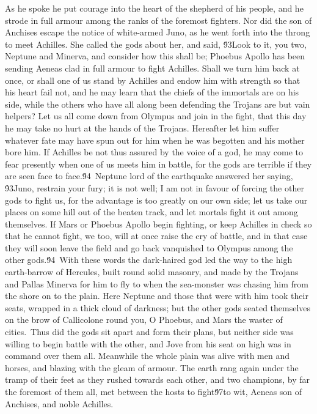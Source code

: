 {As he spoke he put courage into the heart of the shepherd of his people, and he strode in full armour among the ranks of the foremost fighters. Nor did the son of Anchises escape the notice of white-armed Juno, as he went forth into the throng to meet Achilles. She called the gods about her, and said, \'93Look to it, you two, Neptune and Minerva, and consider how this shall be; Phoebus Apollo has been sending Aeneas clad in full armour to fight Achilles. Shall we turn him back at once, or shall one of us stand by Achilles and endow him with strength so that his heart fail not, and he may learn that the chiefs of the immortals are on his side, while the others who have all along been defending the Trojans are but vain helpers? Let us all come down from Olympus and join in the fight, that this day he may take no hurt at the hands of the Trojans. Hereafter let him suffer whatever fate may have spun out for him when he was begotten and his mother bore him. If Achilles be not thus assured by the voice of a god, he may come to fear presently when one of us meets him in battle, for the gods are terrible if they are seen face to face.\'94\
Neptune lord of the earthquake answered her saying, \'93Juno, restrain your fury; it is not well; I am not in favour of forcing the other gods to fight us, for the advantage is too greatly on our own side; let us take our places on some hill out of the beaten track, and let mortals fight it out among themselves. If Mars or Phoebus Apollo begin fighting, or keep Achilles in check so that he cannot fight, we too, will at once raise the cry of battle, and in that case they will soon leave the field and go back vanquished to Olympus among the other gods.\'94\
With these words the dark-haired god led the way to the high earth-barrow of Hercules, built round solid masonry, and made by the Trojans and Pallas Minerva for him to fly to when the sea-monster was chasing him from the shore on to the plain. Here Neptune and those that were with him took their seats, wrapped in a thick cloud of darkness; but the other gods seated themselves on the brow of Callicolone round you, O Phoebus, and Mars the waster of cities.\
Thus did the gods sit apart and form their plans, but neither side was willing to begin battle with the other, and Jove from his seat on high was in command over them all. Meanwhile the whole plain was alive with men and horses, and blazing with the gleam of armour. The earth rang again under the tramp of their feet as they rushed towards each other, and two champions, by far the foremost of them all, met between the hosts to fight\'97to wit, Aeneas son of Anchises, and noble Achilles.\
}
